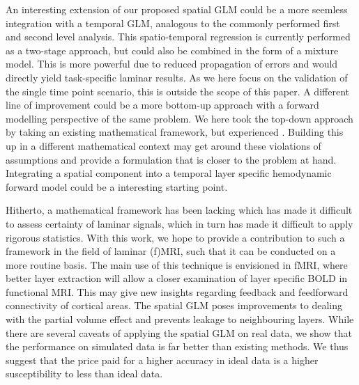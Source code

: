 An interesting extension of our proposed spatial GLM could be a more seemless integration with a temporal GLM, analogous to the commonly performed first and second level analysis. This spatio-temporal regression is currently performed as a two-stage approach, but could also be combined in the form of a mixture model. This is more powerful due to reduced propagation of errors \cite{Beckmann2003} and would directly yield task-specific laminar results. As we here focus on the validation of the single time point scenario, this is outside the scope of this paper. A different line of improvement could be a more bottom-up approach with a forward modelling perspective of the same problem. We here took the top-down approach by taking an existing mathematical framework, but experienced . Building this up in a different mathematical context may get around these violations of assumptions and provide a formulation that is closer to the problem at hand. Integrating a spatial component into a temporal layer specific hemodynamic forward model \cite{Heinzle2016} could be a interesting starting point.

Hitherto, a mathematical framework has been lacking which has made it difficult to assess certainty  of laminar signals, which in turn has made it difficult to apply rigorous statistics. With this work, we hope to provide a contribution to such a framework in the field of laminar (f)MRI, such that it can be conducted on a more routine basis. The main use of this technique is envisioned in fMRI, where better layer extraction will allow a closer examination of layer specific BOLD in functional MRI. This may give new insights regarding feedback and feedforward connectivity of cortical areas. The spatial GLM poses improvements to dealing with the partial volume effect and prevents leakage to neighbouring layers. While there are several caveats of applying the spatial GLM on real data, we show that the performance on simulated data is far better than existing methods. We thus suggest that the price paid for a higher accuracy in ideal data is a higher susceptibility to less than ideal data.
